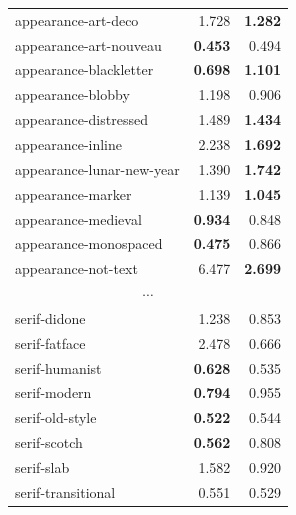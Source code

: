 \begin{longtable}{|l|r|r|}
appearance-art-deco       & 1.728                   & \textbf{1.282}      \\
appearance-art-nouveau    & \textbf{0.453}          & 0.494               \\
appearance-blackletter    & \textbf{0.698}          & \textbf{1.101}      \\
appearance-blobby         & 1.198                   & 0.906               \\
appearance-distressed     & 1.489                   & \textbf{1.434}      \\
appearance-inline         & 2.238                   & \textbf{1.692}      \\
appearance-lunar-new-year & 1.390                   & \textbf{1.742}      \\
appearance-marker         & 1.139                   & \textbf{1.045}      \\
appearance-medieval       & \textbf{0.934}          & 0.848               \\
appearance-monospaced     & \textbf{0.475}          & 0.866               \\
appearance-not-text       & 6.477                   & \textbf{2.699}      \\
\hline
\multicolumn{3}{|c|}{$\cdots$} \\
\hline
serif-didone              & 1.238                   & 0.853               \\
serif-fatface             & 2.478                   & 0.666               \\
serif-humanist            & \textbf{0.628}          & 0.535               \\
serif-modern              & \textbf{0.794}          & 0.955               \\
serif-old-style           & \textbf{0.522}          & 0.544               \\
serif-scotch              & \textbf{0.562}          & 0.808               \\
serif-slab                & 1.582                   & 0.920               \\
serif-transitional        & 0.551                   & 0.529         \\           

\end{longtable}

